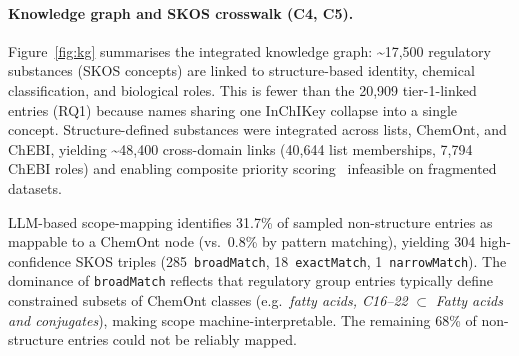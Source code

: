 \paragraph{Knowledge graph and SKOS crosswalk (C4, C5).}
Figure~\ref{fig:kg} summarises the integrated knowledge graph: \textasciitilde{}17,500 regulatory substances (SKOS concepts) are linked to structure-based identity, chemical classification, and biological roles. This is fewer than the 20,909 tier-1-linked entries (RQ1) because names sharing one InChIKey collapse into a single concept.
Structure-defined substances were integrated across lists, ChemOnt, and ChEBI, yielding \textasciitilde{}48,400 cross-domain links (40,644 list memberships, 7,794 ChEBI roles) and enabling composite priority scoring~\cite{Reif2010} infeasible on fragmented datasets.



LLM-based scope-mapping identifies 31.7\% of sampled non-structure entries as mappable to a ChemOnt node (vs.\ 0.8\% by pattern matching), yielding 304 high-confidence SKOS triples (285~\texttt{broadMatch}, 18~\texttt{exactMatch}, 1~\texttt{narrowMatch}).
The dominance of \texttt{broadMatch} reflects that regulatory group entries typically define constrained subsets of ChemOnt classes (e.g.\ \textit{fatty acids, C16--22} $\subset$ \textit{Fatty acids and conjugates}), making scope machine-interpretable. The remaining 68\% of non-structure entries could not be reliably mapped.
